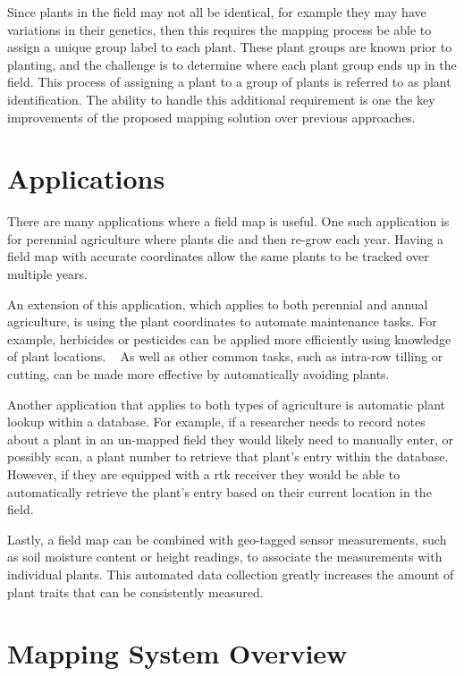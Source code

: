 Since plants in the field may not all be identical, for example they may have variations in their genetics, then this requires the mapping process be able to assign a unique group label to each plant.  These plant groups are known prior to planting, and the challenge is to determine where each plant group ends up in the field.  This process of assigning a plant to a group of plants is referred to as plant identification. The ability to handle this additional requirement is one the key improvements of the proposed mapping solution over previous approaches.

\section{Applications}

There are many applications where a field map is useful.  One such application is for perennial agriculture where plants die and then re-grow each year.  Having a field map with accurate coordinates allow the same plants to be tracked over multiple years.

An extension of this application, which applies to both perennial and annual agriculture, is using the plant coordinates to automate maintenance tasks.  For example, herbicides or pesticides can be applied more efficiently using knowledge of plant locations. ~\citep{Carballido:2013} As well as other common tasks, such as intra-row tilling or cutting, can be made more effective by automatically avoiding plants. ~\citep{Bakker:2010}  

Another application that applies to both types of agriculture is automatic plant lookup within a database.  For example, if a researcher needs to record notes about a plant in an un-mapped field they would likely need to manually enter, or possibly scan, a plant number to retrieve that plant's entry within the database.  However, if they are equipped with a \ac{rtk} receiver they would be able to automatically retrieve the plant's entry based on their current location in the field. 

Lastly, a field map can be combined with geo-tagged sensor measurements, such as soil moisture content or height readings, to associate the measurements with individual plants.  This automated data collection greatly increases the amount of plant traits that can be consistently measured. ~\citep{Ruckelshausen:2009}

\section{Mapping System Overview} 

